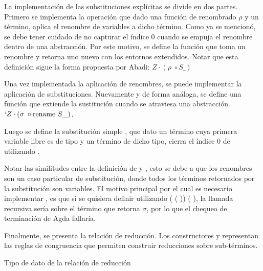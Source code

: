 \documentclass[]{report}
\begin{document}
	La implementación de las substituciones explícitas se divide en dos partes.
	Primero se implementa la operación  que dado una función de renombrado $\rho$ y un término, aplica el renombre de variables a dicho término.
	Como ya se mencionó, se debe tener cuidado de no capturar el índice 0 cuando se empuja el renombre dentro de una abstracción.
	Por este motivo, se define la función  que toma un renombre y retorna uno nuevo con los entornos extendidos.
	Notar que esta definición sigue la forma propuesta por Abadi: $Z \cdot (\rho \; \circ S\_)$
	
	
	Una vez implementada la aplicación de renombres, se puede implementar la aplicación de substituciones.
	Nuevamente y de forma análoga, se define una función  que extiende la sustitución cuando se atraviesa una abstracción. $`Z \cdot (\sigma \; \circ \text{rename } S\_)$.
	
	Luego se define la substitución simple \AgdaFunction{$\_[\_]$}, que dato un término  cuya primera variable libre es de tipo  y un término  de dicho tipo, cierra el índice 0 de  utilizando .
	
	
	Notar las similitudes entre la definición de  y , esto se debe a que los renombres son un caso particular de substitución, donde todos los términos retornados por la substitución son variables.
	El motivo principal por el cual es necesario implementar , es que si se quisiera definir  utilizando  (\AgdaSymbol{$\lambda$}  \AgdaSymbol{$\rightarrow$}  ( )) (\AgdaBound{$\sigma$} ), la llamada recursiva sería sobre el término que retorna $\sigma$, por lo que el chequeo de terminación de Agda fallaría.
	
	
	Finalmente, se presenta la relación de reducción.
	Los constructores \AgdaInductiveConstructor{$\xi$} y \AgdaInductiveConstructor{$\zeta$} representan las reglas de congruencia que permiten construir reducciones sobre sub-términos.

	\begin{codigo}
		Tipo de dato de la relación de reducción
		
	\end{codigo}
	
\end{document}
